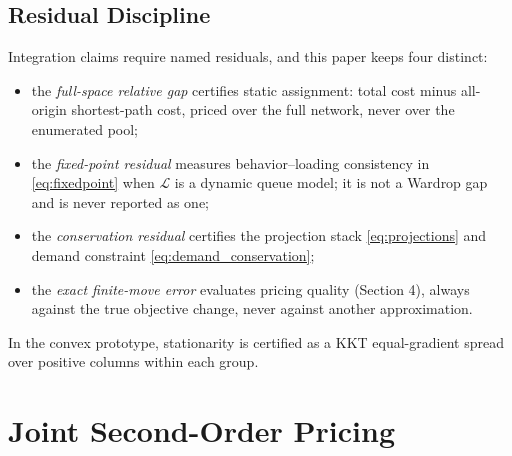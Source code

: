 \documentclass[10pt]{article}
\newcommand{\Load}{\mathcal{L}}
\begin{document}
\subsection{Residual Discipline}
Integration claims require named residuals, and this paper keeps four distinct:
\begin{itemize}
\item the \emph{full-space relative gap} certifies static assignment: total cost minus all-origin shortest-path cost, priced over the full network, never over the enumerated pool;
\item the \emph{fixed-point residual} measures behavior--loading consistency in \eqref{eq:fixedpoint} when $\Load$ is a dynamic queue model; it is not a Wardrop gap and is never reported as one;
\item the \emph{conservation residual} certifies the projection stack \eqref{eq:projections} and demand constraint \eqref{eq:demand_conservation};
\item the \emph{exact finite-move error} evaluates pricing quality (Section 4), always against the true objective change, never against another approximation.
\end{itemize}
In the convex prototype, stationarity is certified as a KKT equal-gradient spread over positive columns within each group.

\section{Joint Second-Order Pricing}
\end{document}
